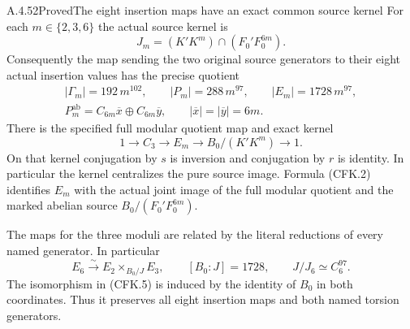 \begin{result}{A.4.52}{Proved}{The eight insertion maps have an exact common source kernel}
For each $m\in\{2,3,6\}$ the actual source kernel is
\[
             J_m=(K'K^m)\cap(F_0'F_0^{6m}).
                                                               \tag{CFK.2}
\]
Consequently the map sending the two original source generators to
their eight actual insertion values has the precise quotient
\[
 \begin{gathered}
 |\Gamma_m|=192\,m^{102},\qquad
 |P_m|=288\,m^{97},\qquad |E_m|=1728\,m^{97},\\
 P_m^{\mathrm{ab}}=C_{6m}\overline x\oplus C_{6m}\overline y,
 \qquad |\overline x|=|\overline y|=6m.
 \end{gathered}                                                 \tag{CFK.3}
\]
There is the specified full modular quotient map and exact kernel
\[
 1\longrightarrow C_3\longrightarrow E_m
      \longrightarrow B_0/(K'K^m)\longrightarrow1.
                                                               \tag{CFK.4}
\]
On that kernel conjugation by $s$ is inversion and conjugation by
$r$ is identity.  In particular the kernel centralizes the pure
source image.  Formula (CFK.2) identifies $E_m$ with the actual joint
image of the full modular quotient and the marked abelian source
$B_0/(F_0'F_0^{6m})$.

The maps for the three moduli are related by the literal reductions
of every named generator.  In particular
\[
 E_6\xrightarrow{\ \sim\ }
 E_2\mathbin{\times}_{B_0/J}E_3,
 \qquad [B_0:J]=1728,
 \qquad J/J_6\simeq C_6^{97}.
                                                               \tag{CFK.5}
\]
The isomorphism in (CFK.5) is induced by the identity of $B_0$ in both
coordinates.  Thus it preserves all eight insertion maps and both
named torsion generators.
\end{result}

